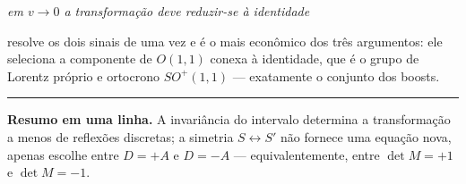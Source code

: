 \documentclass[12pt,a4paper,oneside]{book}
\begin{document}
\begin{center}\itshape
em $v\to0$ a transformação deve reduzir-se à identidade
\end{center}

\noindent
resolve os dois sinais de uma vez e é o mais econômico dos três argumentos:
ele seleciona a componente de $O(1,1)$ conexa à identidade, que é o grupo de
Lorentz próprio e ortocrono $SO^+(1,1)$ --- exatamente o conjunto dos boosts.

\vspace{10pt}
\noindent\textcolor{rgLinha}{\rule{\linewidth}{0.8pt}}
\vspace{4pt}

\noindent
{\small\color{rgGrafite}
\textbf{Resumo em uma linha.} A invariância do intervalo determina a
transformação a menos de reflexões discretas; a simetria $S\leftrightarrow
S'$ não fornece uma equação nova, apenas escolhe entre $D=+A$ e $D=-A$ ---
equivalentemente, entre $\det M=+1$ e $\det M=-1$.}
\end{document}
